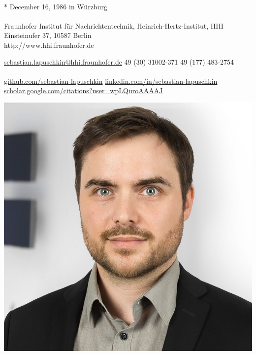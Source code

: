 \documentclass[10pt,a4paper]{article} %
\begin{document}

\noindent
\begin{minipage}{.8\textwidth}

\\
* December 16, 1986 in Würzburg  %
\\
\phantom{Contact:} \\ %
Fraunhofer Institut für Nachrichtentechnik, Heinrich-Hertz-Institut, HHI\\
Einsteinufer 37, 10587 Berlin\\
http://www.hhi.fraunhofer.de

\noindent\href{mailto:sebastian.lapuschkin@hhi.fraunhofer.de}{sebastian.lapuschkin@hhi.fraunhofer.de}\bull %
\textsmaller{+}49 (30) 31002-371\bull
\textsmaller{+}49 (177) 483-2754\\ %
\\
\href{https://github.com/sebastian-lapuschkin}{github.com/sebastian-lapuschkin}\bull %
\href{https://www.linkedin.com/in/sebastian-lapuschkin}{linkedin.com/in/sebastian-lapuschkin}\bull\\ %
\href{https://scholar.google.com/citations?user=wpLQuroAAAAJ}{scholar.google.com/citations?user=wpLQuroAAAAJ} %
\end{minipage}
\begin{minipage}{.2\textwidth}
\includegraphics[width=\textwidth]{resources/mug-2021.jpg}
\end{minipage}
\end{document}
